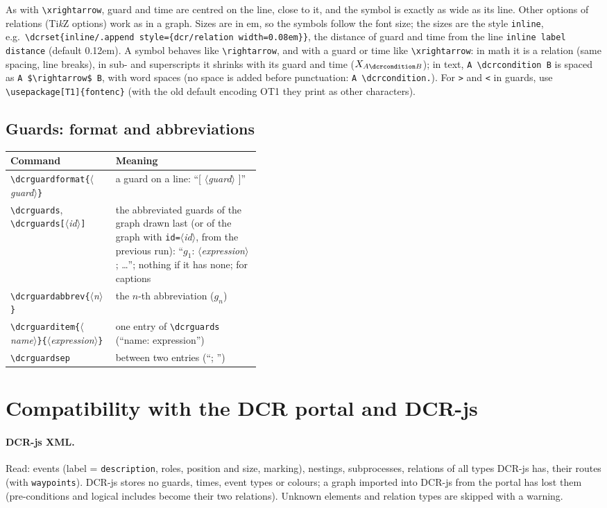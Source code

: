 \documentclass[a4paper,11pt]{article}
\newcommand\cs[1]{\texttt{\textbackslash#1}}
\newcommand\key[1]{\texttt{#1}}
\newcommand\meta[1]{\ensuremath{\langle}\textit{#1}\ensuremath{\rangle}}
\newcommand\marg[1]{\texttt{\{}\meta{#1}\texttt{\}}}
\newcommand\oarg[1]{\texttt{[}\meta{#1}\texttt{]}}
\begin{document}
\medskip
As with \cs{xrightarrow}, guard and time are centred on the line, close to
it, and the symbol is exactly as wide as its line. Other options of
relations (Ti\emph{k}Z options) work as in a graph. Sizes are in em, so the
symbols follow the font size; the sizes are the style \key{inline}, e.g.\
\cs{dcrset\{inline/.append style=\{dcr/relation width=0.08em\}\}}, the
distance of guard and time from the line \key{inline label distance}
(default 0.12em). A symbol behaves like \cs{rightarrow}, and with a guard or
time like \cs{xrightarrow}: in math it is a relation (same spacing, line
breaks), in sub- and superscripts it shrinks with its guard and time
($X_{A \dcrcondition B}$); in text, \verb|A \dcrcondition B| is spaced as
\verb|A $\rightarrow$ B|, with word spaces (no space is added before
punctuation: \verb|A \dcrcondition.|).
For \texttt{>} and \texttt{<} in guards, use \cs{usepackage[T1]\{fontenc\}}
(with the old default encoding OT1 they print as other characters).

\subsection{Guards: format and abbreviations}
\begin{tabularx}{\linewidth}{@{}>{\raggedright\arraybackslash}p{0.42\linewidth}L@{}}
\toprule
Command & Meaning\\
\midrule
\cs{dcrguardformat}\marg{guard} & a guard on a line: ``[ \meta{guard} ]''\\
\cs{dcrguards}, \cs{dcrguards}\oarg{id} & the abbreviated guards of the graph
  drawn last (or of the graph with \key{id=}\meta{id}, from the previous run):
  ``$g_1$: \meta{expression}; \dots''; nothing if it has none; for captions\\
\cs{dcrguardabbrev}\marg{n} & the $n$-th abbreviation ($g_n$)\\
\cs{dcrguarditem}\marg{name}\marg{expression} & one entry of \cs{dcrguards}
  (``name: expression'')\\
\cs{dcrguardsep} & between two entries (``; '')\\
\bottomrule
\end{tabularx}

\appendix
\section{Compatibility with the DCR portal and DCR-js}\label{sec:compat}
\paragraph{DCR-js XML.} Read: events (label = \texttt{description}, roles,
position and size, marking), nestings, subprocesses,
relations of all types DCR-js has, their routes (with \key{waypoints}).
DCR-js stores no guards, times, event types or colours; a graph imported into
DCR-js from the portal has lost them (pre-conditions and logical includes
become their two relations). Unknown
elements and relation types are skipped with a warning.
\end{document}
